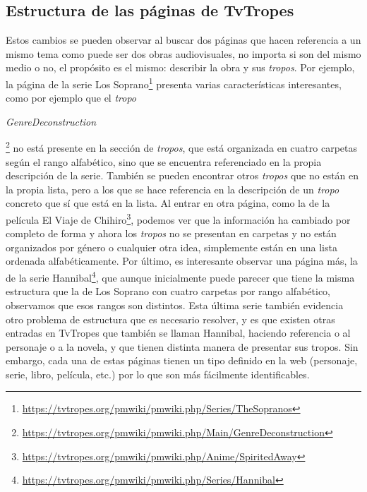 \subsection{Estructura de las páginas de TvTropes}
Estos cambios se pueden observar al buscar dos páginas que hacen referencia a un
mismo tema como puede ser dos obras audiovisuales, no importa si son del mismo
medio o no, el propósito es el mismo: describir la obra y sus \textit{tropos}.
Por ejemplo, la página de la serie Los
Soprano\footnote{\url{https://tvtropes.org/pmwiki/pmwiki.php/Series/TheSopranos}}
presenta varias características interesantes, como por ejemplo que el
\textit{tropo}
\begin{otherlanguage}{english}\textit{GenreDeconstruction}\end{otherlanguage}\footnote{\url{https://tvtropes.org/pmwiki/pmwiki.php/Main/GenreDeconstruction}}
no está presente en la sección de \textit{tropos}, que está organizada en cuatro
carpetas según el rango alfabético, sino que se encuentra referenciado en la
propia descripción de la serie. También se pueden encontrar otros
\textit{tropos} que no están en la propia lista, pero a los que se hace
referencia en la descripción de un \textit{tropo} concreto que sí que está en la
lista. Al entrar en otra página, como la de la película El Viaje de
Chihiro\footnote{\url{https://tvtropes.org/pmwiki/pmwiki.php/Anime/SpiritedAway}},
podemos ver que la información ha cambiado por completo de forma y ahora los
\textit{tropos} no se presentan en carpetas y no están organizados por género o
cualquier otra idea, simplemente están en una lista ordenada alfabéticamente.
Por último, es interesante observar una página más, la de la serie
Hannibal\footnote{\url{https://tvtropes.org/pmwiki/pmwiki.php/Series/Hannibal}},
que aunque inicialmente puede parecer que tiene la misma estructura que la de
Los Soprano con cuatro carpetas por rango alfabético, observamos que esos rangos
son distintos. Esta última serie también evidencia otro problema de estructura
que es necesario resolver, y es que existen otras entradas en TvTropes que
también se llaman Hannibal, haciendo referencia o al personaje o a la novela, y
que tienen distinta manera de presentar sus tropos. Sin embargo, cada una de
estas páginas tienen un tipo definido en la web (personaje, serie, libro,
película, etc.) por lo que son más fácilmente identificables.

